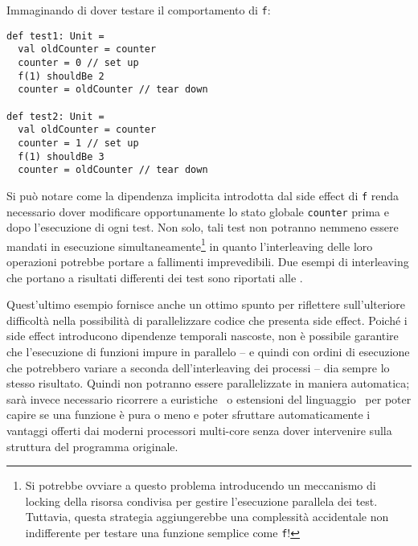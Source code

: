 Immaginando di dover testare il comportamento di \lstinline{f}:
\begin{lstlisting}[language=scala3]
def test1: Unit =
  val oldCounter = counter
  counter = 0 // set up
  f(1) shouldBe 2
  counter = oldCounter // tear down

def test2: Unit =
  val oldCounter = counter
  counter = 1 // set up
  f(1) shouldBe 3
  counter = oldCounter // tear down
\end{lstlisting}
Si può notare come la dipendenza implicita introdotta dal side effect di \lstinline{f} renda necessario dover modificare opportunamente lo stato globale \lstinline{counter} prima e dopo l'esecuzione di ogni test.
Non solo, tali test non potranno nemmeno essere mandati in esecuzione simultaneamente\footnote{Si potrebbe ovviare a questo problema introducendo un meccanismo di locking della risorsa condivisa per gestire l'esecuzione parallela dei test. Tuttavia, questa strategia aggiungerebbe una complessità accidentale non indifferente per testare una funzione semplice come \lstinline{f}!} in quanto l'interleaving delle loro operazioni potrebbe portare a fallimenti imprevedibili.
Due esempi di interleaving che portano a risultati differenti dei test sono riportati alle .




Quest'ultimo esempio fornisce anche un ottimo spunto per riflettere sull'ulteriore difficoltà nella possibilità di parallelizzare codice che presenta side effect.
Poiché i side effect introducono dipendenze temporali nascoste, non è possibile garantire che l'esecuzione di funzioni impure in parallelo -- e quindi con ordini di esecuzione che potrebbero variare a seconda dell'interleaving dei processi -- dia sempre lo stesso risultato.
Quindi non potranno essere parallelizzate in maniera automatica; sarà invece necessario ricorrere a euristiche~\cite{cit:safe-automated-refactoring-for-intelligent-parallelization-of-java-8-streams} o estensioni del linguaggio~\cite{cit:pure-functions-in-c-a-small-keyword-for-automatic-parallelization} per poter capire se una funzione è pura o meno e poter sfruttare automaticamente i vantaggi offerti dai moderni processori multi-core senza dover intervenire sulla struttura del programma originale.
